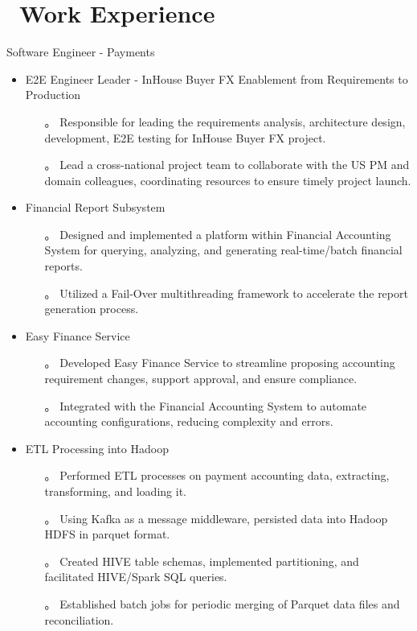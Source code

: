 \documentclass{resume}
\begin{document}
\section{\faUsers\ Work Experience}
Software Engineer - Payments
\begin{itemize}
  \item {E2E Engineer Leader - InHouse Buyer FX Enablement from Requirements to Production}
  \begin{itemize}
    \item[。] Responsible for leading the requirements analysis, architecture design, development, E2E testing for InHouse Buyer FX project.
    \item[。] Lead a cross-national project team to collaborate with the US PM and domain colleagues, coordinating resources to ensure timely project launch.
  \end{itemize}
  \item Financial Report Subsystem
  \begin{itemize}
    \item[。] Designed and implemented a platform within Financial Accounting System for querying, analyzing, and generating real-time/batch financial reports.
    \item[。] Utilized a Fail-Over multithreading framework to accelerate the report generation process.
  \end{itemize}
  \item {Easy Finance Service}
  \begin{itemize}
    \item[。] Developed Easy Finance Service to streamline proposing accounting requirement changes, support approval, and ensure compliance.
    \item[。] Integrated with the Financial Accounting System to automate accounting configurations, reducing complexity and errors.
  \end{itemize}
  \item ETL Processing into Hadoop
  \begin{itemize}
    \item[。] Performed ETL processes on payment accounting data, extracting, transforming, and loading it.
    \item[。] Using Kafka as a message middleware, persisted data into Hadoop HDFS in parquet format.
    \item[。] Created HIVE table schemas, implemented partitioning, and facilitated HIVE/Spark SQL queries.
    \item[。] Established batch jobs for periodic merging of Parquet data files and reconciliation.
  \end{itemize}


\end{itemize}
\end{document}

